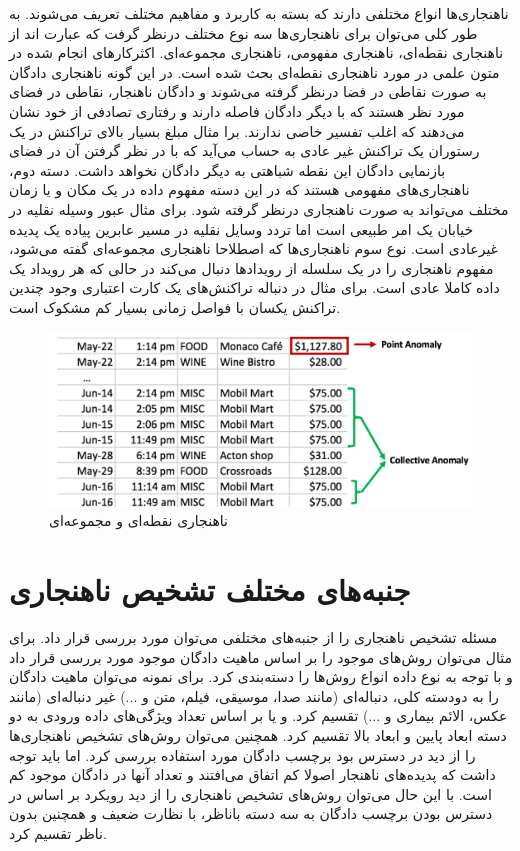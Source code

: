 \documentclass[12pt,a4paper]{report}
\begin{document}
ناهنجاری‌ها انواع مختلفی دارند که بسته به کاربرد و مفاهیم مختلف تعریف می‌شوند. به طور کلی می‌توان برای ناهنجاری‌ها سه نوع مختلف درنظر گرفت که عبارت اند از ناهنجاری نقطه‌ای،‌ ناهنجاری مفهومی‌،‌ ناهنجاری مجموعه‌ای. اکثرکارهای انجام شده در متون علمی در مورد ناهنجاری نقطه‌ای بحث شده است. در این گونه ناهنجاری دادگان به صورت نقاطی در فضا درنظر گرفته می‌شوند و دادگان ناهنجار، نقاطی در فضای مورد نظر هستند که با دیگر دادگان فاصله دارند و رفتاری تصادفی از خود نشان می‌دهند که اغلب تفسیر خاصی ندارند. برا مثال مبلغ بسیار بالای تراکنش در یک رستوران  یک تراکنش غیر عادی به حساب می‌آید که با در نظر گرفتن آن در فضای بازنمایی دادگان این نقطه شباهتی به دیگر دادگان نخواهد داشت. دسته دوم، ناهنجاری‌های مفهومی هستند که در این دسته مفهوم داده در یک مکان‌ و یا زمان‌ مختلف می‌تواند به صورت ناهنجاری درنظر گرفته شود. برای مثال عبور وسیله نقلیه در خیابان یک امر طبیعی است اما تردد وسایل نقلیه در مسیر عابرین پیاده یک پدیده غیرعادی است. نوع سوم ناهنجاری‌ها که اصطلاحا ناهنجاری مجموعه‌ای گفته می‌شود،‌ مفهوم ناهنجاری را در یک سلسله از رویدادها دنبال می‌کند در حالی که هر رویداد یک داده کاملا عادی است. برای مثال در دنباله تراکنش‌های یک کارت اعتباری وجود چندین تراکنش یکسان با فواصل زمانی بسیار کم مشکوک است.

\begin{figure}[!hp]
	\begin{center}
		\includegraphics[width=0.7\linewidth]{./images/figures/credit-card.png}

		\caption{
		ناهنجاری نقطه‌ای و مجموعه‌ای
		\cite{G.Chalapathy}
		}		
		\label{fig:anomaly-example-1}
		\centering
	\end{center}
\end{figure}

\section{جنبه‌های مختلف تشخیص ناهنجاری}
مسئله تشخیص ناهنجاری را از جنبه‌های مختلفی می‌توان مورد بررسی قرار داد. برای مثال می‌توان روش‌های موجود را بر اساس ماهیت دادگان موجود مورد بررسی قرار داد و با توجه به نوع داده انواع روش‌ها را دسته‌بندی کرد. برای نمونه می‌توان ماهیت دادگان را به دودسته کلی، دنباله‌ای (مانند صدا، موسیقی، فیلم، متن و ...) غیر دنباله‌ای (مانند عکس، الائم بیماری و ...) تقسیم کرد. و یا بر اساس تعداد ویژگی‌های داده ورودی به دو دسته ابعاد پایین و ابعاد بالا تقسیم کرد. همچنین می‌توان روش‌های تشخیص ناهنجاری‌ها را از دید در دسترس بود برچسب دادگان مورد استفاده بررسی کرد. اما باید توجه داشت که پدیده‌های ناهنجار اصولا کم اتفاق می‌افتند و تعداد آنها در دادگان موجود کم است. با این حال می‌توان روش‌های تشخیص ناهنجاری را از دید رویکرد بر اساس در دسترس بودن برچسب دادگان به سه دسته باناظر، با نظارت ضعیف و همچنین بدون ناظر تقسیم کرد.
\end{document}
